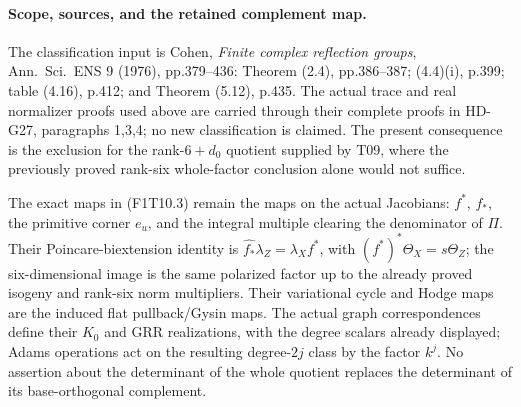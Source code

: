 \paragraph{Scope, sources, and the retained complement map.}
The classification input is Cohen, \emph{Finite complex
reflection groups}, Ann.\ Sci.\ ENS 9 (1976), pp.379--436:
Theorem (2.4), pp.386--387; (4.4)(i), p.399; table (4.16),
p.412; and Theorem (5.12), p.435. The actual trace and real
normalizer proofs used above are carried through their complete
proofs in HD-G27, paragraphs 1,3,4; no new classification is
claimed. The present consequence is the exclusion for the
rank-\(6+d_0\) quotient supplied by T09, where the previously
proved rank-six whole-factor conclusion alone would not
suffice.

The exact maps in (F1T10.3) remain the maps on the actual
Jacobians: \(f^*\), \(f_*\), the primitive corner \(e_u\),
and the integral multiple clearing the denominator of \(\Pi\).
Their Poincare-biextension identity is
\(\widehat{f_*}\lambda_Z=\lambda_X f^*\), with
\((f^*)^*\Theta_X=s\Theta_Z\); the six-dimensional image is
the same polarized factor up to the already proved isogeny
and rank-six norm multipliers. Their variational cycle and
Hodge maps are the induced flat pullback/Gysin maps.
The actual graph correspondences define their \(K_0\) and
GRR realizations, with the degree scalars already displayed;
Adams operations act on the resulting degree-\(2j\) class
by the factor \(k^j\). No assertion about the determinant
of the whole quotient replaces the determinant of its
base-orthogonal complement.
